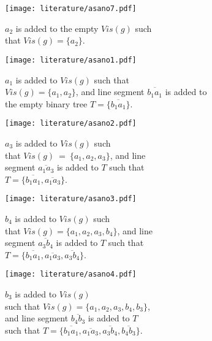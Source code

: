 \begin{figure}[h!]
	\centering
	\begin{subfigure}{0.45\textwidth}
		\texttt{[image: literature/asano7.pdf]}
		\caption{$a_2$ is added to the empty $\mathit{Vis}(g)$ such \\ that $\mathit{Vis}(g) = \{a_2\}$.}
		\label{fig:asano1}
	\end{subfigure}
	\hfill
	\begin{subfigure}{0.45\textwidth}
		\texttt{[image: literature/asano1.pdf]}
		\caption{$a_1$ is added to $\mathit{Vis}(g)$ such that \\ $\mathit{Vis}(g) = \{a_1, a_2\}$, and line segment $\overline{b_1a_1}$ is added to the empty binary tree $T = \{\overline{b_1a_1}\}$.}
	\end{subfigure}
	\begin{subfigure}{0.45\textwidth}
		\texttt{[image: literature/asano2.pdf]}
		\caption{$a_3$ is added to $\mathit{Vis}(g)$ such \\ that $\mathit{Vis}(g)~=~\{a_1, a_2, a_3\}$,  and line \\ segment $\overline{a_1a_3}$ is added to $T$ such that \\ $T = \{\overline{b_1a_1}, \overline{a_1a_3}\}$.}
	\end{subfigure}
	\hfill
	\begin{subfigure}{0.45\textwidth}
		\texttt{[image: literature/asano3.pdf]}
		\caption{$b_4$ is added to $\mathit{Vis}(g)$ such \\ that $\mathit{Vis}(g)=\{a_1, a_2, a_3, b_4\}$, and line \\ segment $\overline{a_3b_4}$ is added to $T$ such that \\ $T = \{\overline{b_1a_1}, \overline{a_1a_3}, \overline{a_3b_4}\}$.}
	\end{subfigure}
	\begin{subfigure}{0.45\textwidth}
		\texttt{[image: literature/asano4.pdf]}
		\caption{$b_3$ is added to $\mathit{Vis}(g)$ \\ such that $\mathit{Vis}(g)=\{a_1, a_2, a_3, b_4, b_3\}$, \\ and line segment $\overline{b_4b_3}$ is added to $T$ \\ such that $T = \{\overline{b_1a_1}, \overline{a_1a_3}, \overline{a_3b_4}, \overline{b_4b_3}\}$.}
	\end{subfigure}
	\hfill
	\begin{subfigure}{0.45\textwidth}

\end{subfigure}
\end{figure}
